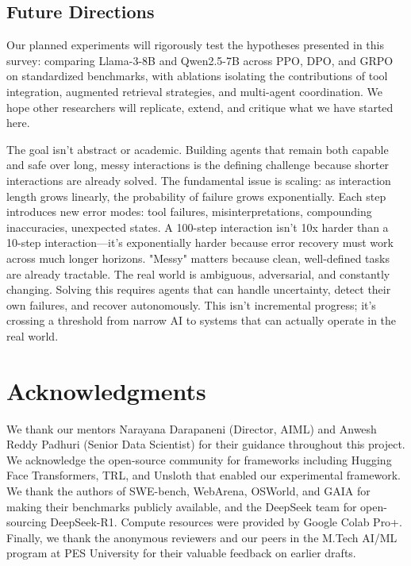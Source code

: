 \documentclass[12pt,a4paper]{report}
\theoremstyle{definition}
\begin{document}
\section*{Future Directions}

Our planned experiments will rigorously test the hypotheses presented in this survey: comparing Llama-3-8B and Qwen2.5-7B across PPO, DPO, and GRPO on standardized benchmarks, with ablations isolating the contributions of tool integration, augmented retrieval strategies, and multi-agent coordination.
 We hope other researchers will replicate, extend, and critique what we have started here.

The goal isn't abstract or academic. Building agents that remain both capable and safe over long, messy interactions is the defining challenge because shorter interactions are already solved. The fundamental issue is scaling: as interaction length grows linearly, the probability of failure grows exponentially. Each step introduces new error modes: tool failures, misinterpretations, compounding inaccuracies, unexpected states. A 100-step interaction isn't 10x harder than a 10-step interaction—it's exponentially harder because error recovery must work across much longer horizons. "Messy" matters because clean, well-defined tasks are already tractable. The real world is ambiguous, adversarial, and constantly changing. Solving this requires agents that can handle uncertainty, detect their own failures, and recover autonomously. This isn't incremental progress; it's crossing a threshold from narrow AI to systems that can actually operate in the real world.

\chapter*{Acknowledgments}

We thank our mentors Narayana Darapaneni (Director, AIML) and Anwesh Reddy Padhuri (Senior Data Scientist) for their guidance throughout this project. We acknowledge the open-source community for frameworks including Hugging Face Transformers, TRL, and Unsloth that enabled our experimental framework. We thank the authors of SWE-bench, WebArena, OSWorld, and GAIA for making their benchmarks publicly available, and the DeepSeek team for open-sourcing DeepSeek-R1. Compute resources were provided by Google Colab Pro+. Finally, we thank the anonymous reviewers and our peers in the M.Tech AI/ML program at PES University for their valuable feedback on earlier drafts.
\end{document}
